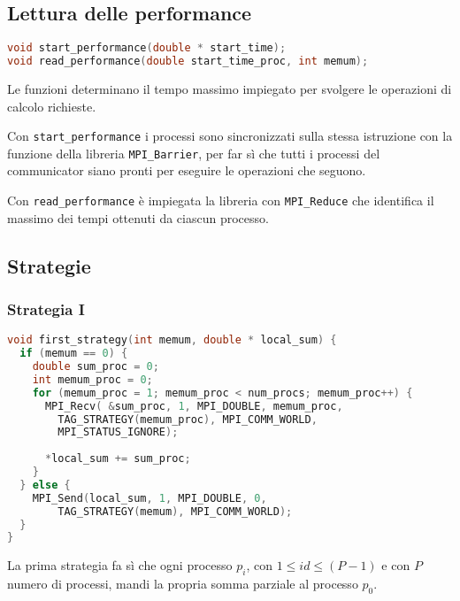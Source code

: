 \documentclass[a4paper,11pt]{book}
\begin{document}
\subsection{Lettura delle performance}
\begin{lstlisting}[language=C]
void start_performance(double * start_time);
void read_performance(double start_time_proc, int memum);
\end{lstlisting}
Le funzioni determinano il tempo massimo impiegato per svolgere le operazioni di calcolo richieste. \par 
Con \verb|start_performance| i processi sono sincronizzati sulla stessa istruzione con la funzione della libreria \verb|MPI_Barrier|, per far sì che tutti i processi del communicator siano pronti per eseguire le operazioni che seguono. \par 
Con \verb|read_performance| è impiegata la libreria con \verb|MPI_Reduce| che identifica il massimo dei tempi ottenuti da ciascun processo. 

\subsection{Strategie}
\subsubsection{Strategia I}
\begin{lstlisting}[language=C]
void first_strategy(int memum, double * local_sum) {
  if (memum == 0) {
    double sum_proc = 0;
    int memum_proc = 0;
    for (memum_proc = 1; memum_proc < num_procs; memum_proc++) {
      MPI_Recv( &sum_proc, 1, MPI_DOUBLE, memum_proc,
        TAG_STRATEGY(memum_proc), MPI_COMM_WORLD,
        MPI_STATUS_IGNORE);
        
      *local_sum += sum_proc;
    }
  } else {
    MPI_Send(local_sum, 1, MPI_DOUBLE, 0,
        TAG_STRATEGY(memum), MPI_COMM_WORLD);
  }
}
\end{lstlisting}
La prima strategia fa sì che ogni processo $p_i$, con $1 \leq id \leq (P-1)$ e con $P$ numero di processi, mandi la propria somma parziale al processo $p_0$.
\end{document}
